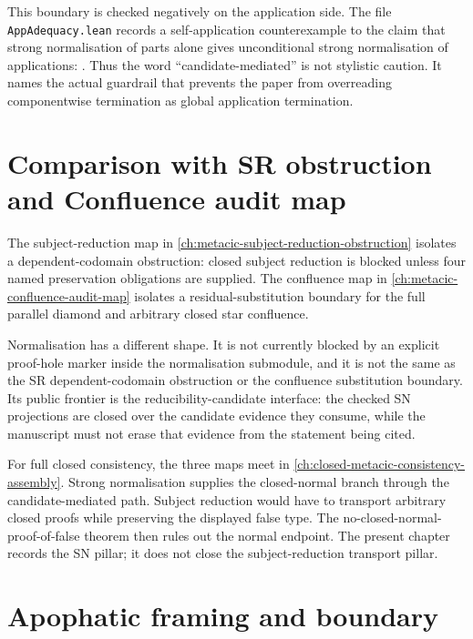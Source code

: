 This boundary is checked negatively on the application side. The file
\texttt{AppAdequacy.lean} records a self-application counterexample to the claim
that strong normalisation of parts alone gives unconditional strong
normalisation of applications:
.
Thus the word ``candidate-mediated'' is not stylistic caution. It names the
actual guardrail that prevents the paper from overreading componentwise
termination as global application termination.

\section{Comparison with SR obstruction and Confluence audit map}
\label{sec:metacic-normalization-audit-map-comparison}

The subject-reduction map in
\autoref{ch:metacic-subject-reduction-obstruction} isolates a
dependent-codomain obstruction: closed subject reduction is blocked unless four
named preservation obligations are supplied. The confluence map in
\autoref{ch:metacic-confluence-audit-map} isolates a residual-substitution
boundary for the full parallel diamond and arbitrary closed star confluence.

Normalisation has a different shape. It is not currently blocked by an explicit
proof-hole marker inside the normalisation submodule, and it is not the same as
the SR dependent-codomain obstruction or the confluence substitution boundary.
Its public frontier is the reducibility-candidate interface: the checked SN
projections are closed over the candidate evidence they consume, while the
manuscript must not erase that evidence from the statement being cited.

For full closed consistency, the three maps meet in
\autoref{ch:closed-metacic-consistency-assembly}. Strong normalisation supplies
the closed-normal branch through the candidate-mediated path. Subject reduction
would have to transport arbitrary closed proofs while preserving the displayed
false type. The no-closed-normal-proof-of-false theorem then rules out the
normal endpoint. The present chapter records the SN pillar; it does not close
the subject-reduction transport pillar.

\section{Apophatic framing and boundary}
\label{sec:metacic-normalization-audit-map-boundary}

